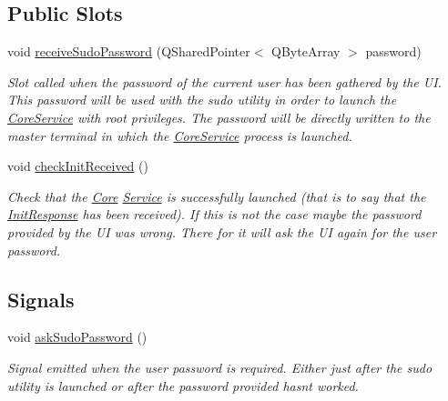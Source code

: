 \subsection*{Public Slots}
\begin{DoxyCompactItemize}
\item 
void \hyperlink{class_gost_crypt_1_1_core_1_1_core_service_handler_a1ae93e4e0b18855583cd1f3cb071e540}{receive\+Sudo\+Password} (Q\+Shared\+Pointer$<$ Q\+Byte\+Array $>$ password)
\begin{DoxyCompactList}\small\item\em Slot called when the password of the current user has been gathered by the UI. This password will be used with the sudo utility in order to launch the \hyperlink{class_gost_crypt_1_1_core_1_1_core_service}{Core\+Service} with root privileges. The password will be directly written to the master terminal in which the \hyperlink{class_gost_crypt_1_1_core_1_1_core_service}{Core\+Service} process is launched. \end{DoxyCompactList}\item 
void \hyperlink{class_gost_crypt_1_1_core_1_1_core_service_handler_a20ab0f3904bea76d6dd71ead5f03c964}{check\+Init\+Received} ()
\begin{DoxyCompactList}\small\item\em Check that the \hyperlink{namespace_gost_crypt_1_1_core}{Core} \hyperlink{class_gost_crypt_1_1_core_1_1_service}{Service} is successfully launched (that is to say that the \hyperlink{struct_gost_crypt_1_1_core_1_1_init_response}{Init\+Response} has been received). If this is not the case maybe the password provided by the UI was wrong. There for it will ask the UI again for the user password. \end{DoxyCompactList}\end{DoxyCompactItemize}
\subsection*{Signals}
\begin{DoxyCompactItemize}
\item 
void \hyperlink{class_gost_crypt_1_1_core_1_1_core_service_handler_a98f52c19cd19ee3e4fe554eeb0b726a0}{ask\+Sudo\+Password} ()
\begin{DoxyCompactList}\small\item\em Signal emitted when the user password is required. Either just after the sudo utility is launched or after the password provided hasn\textquotesingle{}t worked. \end{DoxyCompactList}\end{DoxyCompactItemize}
